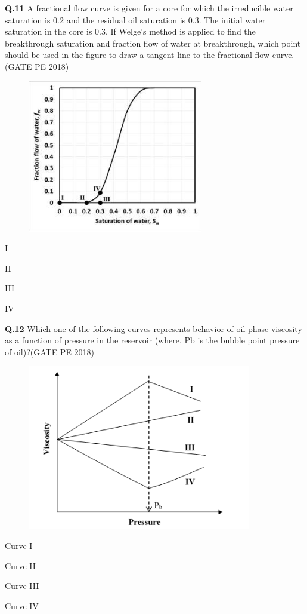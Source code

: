 \documentclass[15pt,a4paper]{article}
\begin{document}
\noindent
\textbf{Q.11} A fractional flow curve is given for a core for which the irreducible water saturation is 0.2
and the residual oil saturation is 0.3. The initial water saturation in the core is 0.3. If
Welge’s method is applied to find the breakthrough saturation and fraction flow of water at
breakthrough, which point should be used in the figure to draw a tangent line to the
fractional flow curve.\hfill(GATE PE 2018)

\begin{figure}[h!]
  \centering
  \includegraphics[width=0.4\columnwidth]{pic6.png} 
\end{figure}

\begin{enumerate}
\begin{multicols}{4}
\item I \item II \item III \item IV
\end{multicols}
\end{enumerate}

\pagebreak

\noindent
\textbf{Q.12} Which one of the following curves represents behavior of oil phase viscosity as a function
of pressure in the reservoir (where, Pb is the bubble point pressure of oil)?\hfill(GATE PE 2018)

\begin{figure}[h!]
  \centering
  \includegraphics[width=0.6\columnwidth]{pic7.png} 
\end{figure}
\begin{enumerate}
\begin{multicols}{4}
	\item Curve I  \item Curve II \item Curve III \item Curve IV
\end{multicols}
\end{enumerate}
\end{document}
